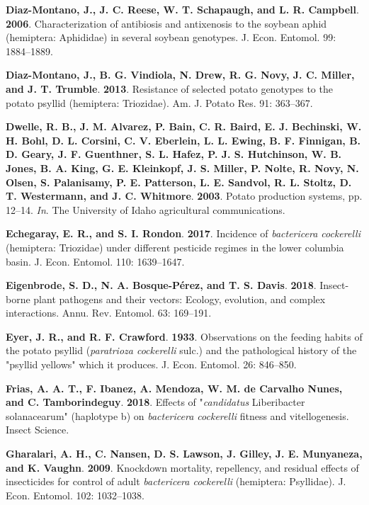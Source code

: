 \documentclass[]{article}
\begin{document}
\leavevmode\hypertarget{ref-Diaz-Montano2006}{}%
\textbf{Diaz-Montano, J., J. C. Reese, W. T. Schapaugh, and L. R.
Campbell}. \textbf{2006}. Characterization of antibiosis and antixenosis
to the soybean aphid (hemiptera: Aphididae) in several soybean
genotypes. J. Econ. Entomol. 99: 1884--1889.

\leavevmode\hypertarget{ref-Diaz-Montano2013}{}%
\textbf{Diaz-Montano, J., B. G. Vindiola, N. Drew, R. G. Novy, J. C.
Miller, and J. T. Trumble}. \textbf{2013}. Resistance of selected potato
genotypes to the potato psyllid (hemiptera: Triozidae). Am. J. Potato
Res. 91: 363--367.

\leavevmode\hypertarget{ref-Dwelle2003}{}%
\textbf{Dwelle, R. B., J. M. Alvarez, P. Bain, C. R. Baird, E. J.
Bechinski, W. H. Bohl, D. L. Corsini, C. V. Eberlein, L. L. Ewing, B. F.
Finnigan, B. D. Geary, J. F. Guenthner, S. L. Hafez, P. J. S.
Hutchinson, W. B. Jones, B. A. King, G. E. Kleinkopf, J. S. Miller, P.
Nolte, R. Novy, N. Olsen, S. Palanisamy, P. E. Patterson, L. E. Sandvol,
R. L. Stoltz, D. T. Westermann, and J. C. Whitmore}. \textbf{2003}.
Potato production systems, pp. 12--14. \emph{In}. The University of
Idaho agricultural communications.

\leavevmode\hypertarget{ref-Echegaray2017}{}%
\textbf{Echegaray, E. R., and S. I. Rondon}. \textbf{2017}. Incidence of
\emph{bactericera cockerelli} (hemiptera: Triozidae) under different
pesticide regimes in the lower columbia basin. J. Econ. Entomol. 110:
1639--1647.

\leavevmode\hypertarget{ref-Eigenbrode2018}{}%
\textbf{Eigenbrode, S. D., N. A. Bosque-Pérez, and T. S. Davis}.
\textbf{2018}. Insect-borne plant pathogens and their vectors: Ecology,
evolution, and complex interactions. Annu. Rev. Entomol. 63: 169--191.

\leavevmode\hypertarget{ref-Eyer1933}{}%
\textbf{Eyer, J. R., and R. F. Crawford}. \textbf{1933}. Observations on
the feeding habits of the potato psyllid (\emph{paratrioza cockerelli}
sulc.) and the pathological history of the "psyllid yellows" which it
produces. J. Econ. Entomol. 26: 846--850.

\leavevmode\hypertarget{ref-Frias2018}{}%
\textbf{Frias, A. A. T., F. Ibanez, A. Mendoza, W. M. de Carvalho Nunes,
and C. Tamborindeguy}. \textbf{2018}. Effects of "\emph{candidatus}
Liberibacter solanacearum" (haplotype b) on \emph{bactericera
cockerelli} fitness and vitellogenesis. Insect Science.

\leavevmode\hypertarget{ref-Gharalari2009}{}%
\textbf{Gharalari, A. H., C. Nansen, D. S. Lawson, J. Gilley, J. E.
Munyaneza, and K. Vaughn}. \textbf{2009}. Knockdown mortality,
repellency, and residual effects of insecticides for control of adult
\emph{bactericera cockerelli} (hemiptera: Psyllidae). J. Econ. Entomol.
102: 1032--1038.
\end{document}
